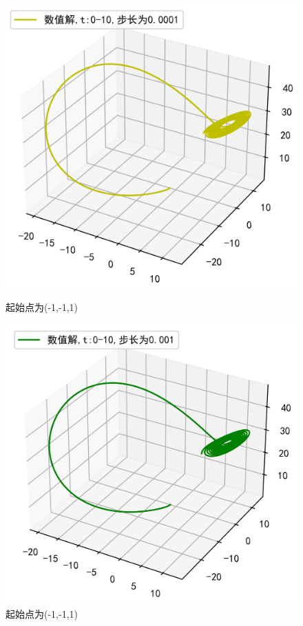 \documentclass[a4paper]{article}%
\begin{document}
\begin{figure}[h]
    \begin{minipage}{0.48\linewidth}
    \centering
    \includegraphics[scale=0.65]{51}
    \caption{起始点为(-1,-1,1)}
    \end{minipage}
    \begin{minipage}{0.48\linewidth}
    \centering
    \includegraphics[scale=0.65]{52}
    \caption{起始点为(-1,-1,1)}
    \end{minipage}
\end{figure}
\end{document}

